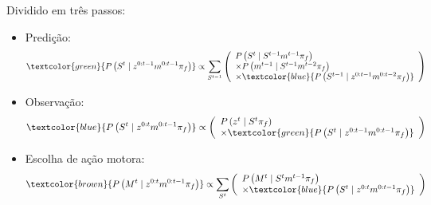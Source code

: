 \documentclass{beamer}
\begin{document}

\begin{frame}
Dividido em três passos:
\begin{itemize}
	\item Predição: $$
	\textcolor{green}{ P \left( S^t \mid z^{0: t-1} m^{0: t-1} \pi_f \right) } \propto \sum\limits_{S^{t-1}}
        \left(
            \begin{array}{l}
                P \left( S^t \mid S^{t-1} m^{t-1} \pi_f \right) \\
                \times P \left( m^{t-1} \mid S^{t-1} m^{t-2} \pi_f \right)\\
                \times \textcolor{blue}{ P \left( S^{t-1} \mid z^{0: t-1} m^{0: t-2} \pi_f \right) }
            \end{array}
        \right)
    $$\pause
	\item Observação: $$
	\textcolor{blue}{ P \left( S^t \mid z^{0: t} m^{0: t-1} \pi_f \right) } \propto 
        \left(
            \begin{array}{l}
                P \left( z^t \mid S^t \pi_f \right) \\
                \times \textcolor{green}{ P \left( S^t \mid z^{0: t-1} m^{0: t-1} \pi_f \right) }
            \end{array}
        \right)
    $$\pause
	\item Escolha de ação motora: $$
	\textcolor{brown}{ P \left( M^t \mid z^{0: t} m^{0: t-1} \pi_f \right) } \propto \sum\limits_{S^t}
        \left(
            \begin{array}{l}
                P \left( M^t \mid S^t m^{t-1} \pi_f \right)\\
                \times \textcolor{blue}{ P \left( S^t \mid z^{0: t} m^{0: t-1} \pi_f \right) }
            \end{array}
        \right)
    $$
\end{itemize}
\end{frame}

\end{document}
